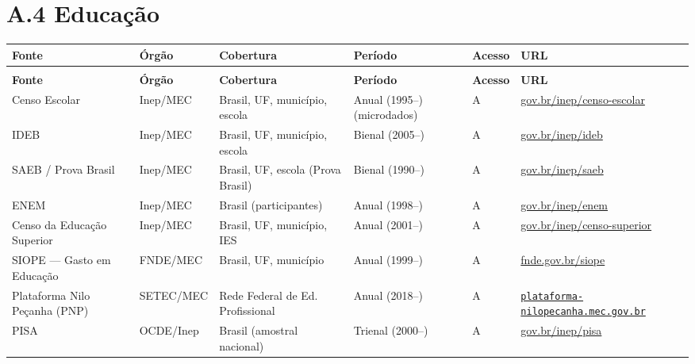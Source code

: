 \section*{A.4 Educação}

{\setlength{\tabcolsep}{3pt}\footnotesize\begin{longtable}{@{} >{\raggedright\arraybackslash}p{2.9cm} >{\raggedright\arraybackslash}p{2.3cm} >{\raggedright\arraybackslash}p{2.4cm} >{\raggedright\arraybackslash}p{2.4cm} >{\raggedright\arraybackslash}p{1.1cm} >{\raggedright\arraybackslash}p{3.2cm} @{}}
\toprule
\textbf{Fonte} & \textbf{Órgão} & \textbf{Cobertura} & \textbf{Período} & \textbf{Acesso} & \textbf{URL} \\
\midrule
\endfirsthead
\multicolumn{6}{l}{\small\textit{(continuação)}} \\
\toprule
\textbf{Fonte} & \textbf{Órgão} & \textbf{Cobertura} & \textbf{Período} & \textbf{Acesso} & \textbf{URL} \\
\midrule
\endhead
\bottomrule
\endfoot

Censo Escolar
  & Inep/MEC
  & Brasil, UF, município, escola
  & Anual (1995--) (microdados)
  & A
  & \url{gov.br/inep/censo-escolar} \\

IDEB
  & Inep/MEC
  & Brasil, UF, município, escola
  & Bienal (2005--)
  & A
  & \url{gov.br/inep/ideb} \\

SAEB / Prova Brasil
  & Inep/MEC
  & Brasil, UF, escola (Prova Brasil)
  & Bienal (1990--)
  & A
  & \url{gov.br/inep/saeb} \\

ENEM
  & Inep/MEC
  & Brasil (participantes)
  & Anual (1998--)
  & A
  & \url{gov.br/inep/enem} \\

Censo da Educação Superior
  & Inep/MEC
  & Brasil, UF, município, IES
  & Anual (2001--)
  & A
  & \url{gov.br/inep/censo-superior} \\

SIOPE --- Gasto em Educação
  & FNDE/MEC
  & Brasil, UF, município
  & Anual (1999--)
  & A
  & \url{fnde.gov.br/siope} \\

Plataforma Nilo Peçanha (PNP)
  & SETEC/MEC
  & Rede Federal de Ed. Profissional
  & Anual (2018--)
  & A
  & \href{https://plataformanilopecanha.mec.gov.br}{\nolinkurl{plataforma-nilopecanha.mec.gov.br}} \\

PISA
  & OCDE/Inep
  & Brasil (amostral nacional)
  & Trienal (2000--)
  & A
  & \url{gov.br/inep/pisa} \\

\end{longtable}}

